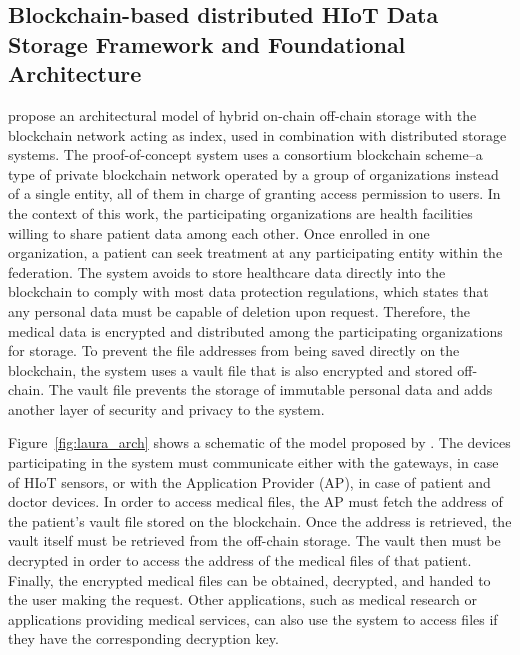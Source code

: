 \documentclass[cic,tc,english]{iiufrgs}
\numberwithin{algorithm}{chapter}
\begin{document}
        \subsection{Blockchain-based distributed HIoT Data Storage Framework and Foundational Architecture}
            \citet{laura2023} propose an architectural model of hybrid on-chain off-chain storage with the blockchain network acting as index, used in combination with distributed storage systems.  The proof-of-concept system uses a consortium blockchain scheme--a type of private blockchain network operated by a group of organizations instead of a single entity, all of them in charge of granting access permission to users. In the context of this work, the participating organizations are health facilities willing to share patient data among each other. Once enrolled in one organization, a patient can seek treatment at any participating entity within the federation. The system avoids to store healthcare data directly into the blockchain to comply with most data protection regulations, which states that any personal data must be capable of deletion upon request.  Therefore, the medical data is encrypted and distributed among the participating organizations for storage. To prevent the file addresses from being saved directly on the blockchain, the system uses a vault file that is also encrypted and stored off-chain. The vault file prevents the storage of immutable personal data and adds another layer of security and privacy to the system.

            Figure~\ref{fig:laura_arch} shows a schematic of the model proposed by \citet{laura2023}. The devices participating in the system must communicate either with the gateways, in case of HIoT sensors, or with the Application Provider (AP), in case of patient and doctor devices. In order to access medical files, the AP must fetch the address of the patient's vault file stored on the blockchain. Once the address is retrieved, the vault itself must be retrieved from the off-chain storage. The vault then must be decrypted in order to access the address of the medical files of that patient. Finally, the encrypted medical files can be obtained, decrypted, and handed to the user making the request. Other applications, such as medical research or applications providing medical services, can also use the system to access files if they have the corresponding decryption key.
\end{document}
